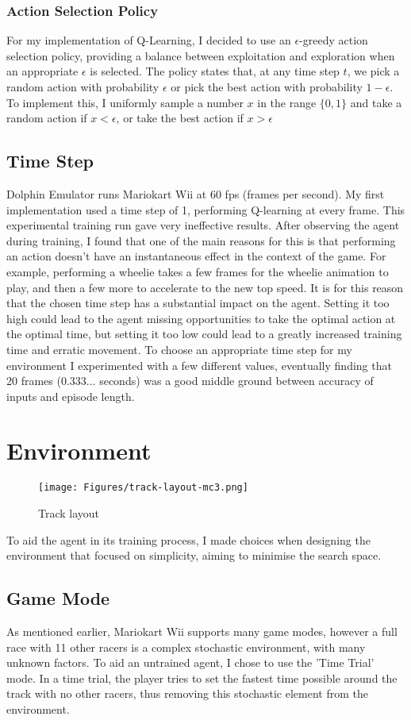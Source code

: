 \subsubsection{Action Selection Policy}
\label{sec:eps-greedy}
For my implementation of Q-Learning, I decided to use an $\epsilon$-greedy action selection policy, providing a balance between exploitation and exploration when an appropriate $\epsilon$ is selected. The policy states that, at any time step $t$, we pick a random action with probability $\epsilon$ or pick the best action with probability $1-\epsilon$. To implement this, I uniformly sample a number $x$ in the range $\{0,1\}$ and take a random action if $x < \epsilon$, or take the best action if $x > \epsilon$
\subsection{Time Step}
Dolphin Emulator runs Mariokart Wii at 60 fps (frames per second). My first implementation used a time step of 1, performing Q-learning at every frame. This experimental training run gave very ineffective results. After observing the agent during training, I found that one of the main reasons for this is that performing an action doesn't have an instantaneous effect in the context of the game. For example, performing a wheelie takes a few frames for the wheelie animation to play, and then a few more to accelerate to the new top speed. It is for this reason that the chosen time step has a substantial impact on the agent. Setting it too high could lead to the agent missing opportunities to take the optimal action at the optimal time, but setting it too low  could lead to a greatly increased training time and erratic movement. To choose an appropriate time step for my environment I experimented with a few different values, eventually finding that 20 frames (0.333... seconds) was a good middle ground between accuracy of inputs and episode length.
\section{Environment}
\begin{figure}[bht]
    \centering
    \texttt{[image: Figures/track-layout-mc3.png]}
    \caption{Track layout}
    \label{fig:track-layout}
\end{figure}
To aid the agent in its training process, I made choices when designing the environment that focused on simplicity, aiming to minimise the search space.
\subsection{Game Mode}
As mentioned earlier, Mariokart Wii supports many game modes, however a full race with 11 other racers is a complex stochastic environment, with many unknown factors. To aid an untrained agent, I chose to use the 'Time Trial' mode. In a time trial, the player tries to set the fastest time possible around the track with no other racers, thus removing this stochastic element from the environment.  
